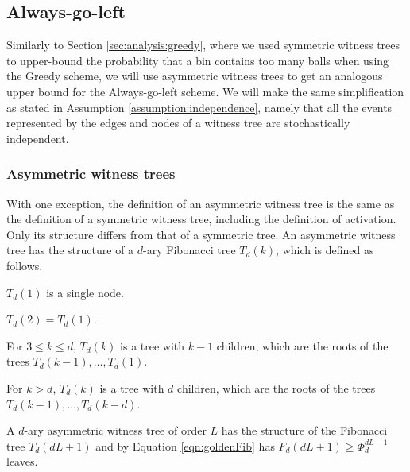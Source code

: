 \documentclass[a4paper,12pt]{article}
\newcommand\todo[1]{\textcolor{red}{(TODO: #1)}}
\begin{document}
\subsection{Always-go-left}
\label{sec:analysis:alg}
Similarly to Section \ref{sec:analysis:greedy}, where we used symmetric witness trees to upper-bound the probability that a bin contains too many balls when using the Greedy scheme, we will use asymmetric witness trees to get an analogous upper bound for the Always-go-left scheme. We will make the same simplification as stated in Assumption \ref{assumption:independence}, namely that all the events represented by the edges and nodes of a witness tree are stochastically independent.

\subsubsection{Asymmetric witness trees}
\label{sec:analysis:definitionAsymWT}
With one exception, the definition of an asymmetric witness tree is the same as the definition of a symmetric witness tree, including the definition of activation. Only its structure differs from that of a symmetric tree. An asymmetric witness tree has the structure of a $d$-ary Fibonacci tree $T_d\left(k \right)$, which is defined as follows.
\begin{compactitem}
\item $T_d(1)$ is a single node.
\item $T_d(2) = T_d(1)$.
\item For $3\leq k \leq d$, $T_d(k)$ is a tree with $k-1$ children, which are the roots of the trees $T_d(k-1),\ldots,T_d(1)$.
\item For $k>d$, $T_d(k)$ is a tree with $d$ children, which are the roots of the trees $T_d(k-1),\ldots,T_d(k-d)$.
\end{compactitem}

A $d$-ary asymmetric witness tree of order $L$ has the structure of the Fibonacci tree $T_d(d  L+1)$ and by Equation \ref{eqn:goldenFib} has $F_d(d L + 1) \geq \Phi_d^{d L-1}$ leaves. 
\end{document}
